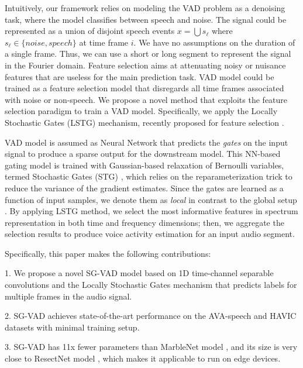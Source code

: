 \documentclass{article}
\begin{document}
Intuitively, our framework relies on modeling the VAD problem as a denoising task, where the model classifies between speech and noise. The signal could be represented as a union of disjoint speech events $x= \bigcup{s_{\ell}}$ where $s_{\ell} \in \{noise, speech \}$ at time frame $i$. We have no assumptions on the duration of a single frame. Thus, we can use a short or long segment to represent the signal in the Fourier domain. Feature selection aims at attenuating noisy or nuisance features that are useless for the main prediction task. VAD model could
be trained as a feature selection model that disregards all time frames associated with noise or non-speech. We propose a novel method that exploits the feature selection paradigm to train a VAD model. 
Specifically, we apply the Locally Stochastic Gates (LSTG) mechanism, recently proposed for feature selection \cite{lindenbaum2021differentiable, yang2022locally}. 

VAD model is assumed as Neural Network that predicts the \textit{gates} on the input signal to produce a sparse output for the downstream model. This NN-based gating model is trained with Gaussian-based relaxation of Bernoulli variables, termed Stochastic Gates (STG) \cite{yamada2020feature}, which relies
on the reparameterization trick \cite{miller2017reducing, figurnov2018implicit} to reduce the variance of the gradient estimates. Since the gates are learned as a function of input samples, we denote them as \textit{local} \cite{yang2022locally} in contrast to the global setup \cite{lindenbaum2021differentiable}. By applying LSTG method, we select the most informative features in spectrum representation in both time and frequency dimensions; then, we aggregate the selection results to produce voice activity estimation for an input audio segment.

Specifically, this paper makes the following contributions: 

1. We propose a novel SG-VAD model based on 1D time-channel separable convolutions and the Locally Stochastic Gates mechanism that predicts labels for multiple frames in the audio signal.

2.  SG-VAD achieves state-of-the-art performance on the AVA-speech \cite{chaudhuri2018ava} and HAVIC datasets \cite{strassel2012creating} with minimal training setup.

3.  SG-VAD has 11x fewer parameters than MarbleNet model \cite{chaudhuri2018ava}, and its size is very close to ResectNet model \cite{kopuklu2022resectnet}, which makes it applicable to run on edge devices.
\end{document}
